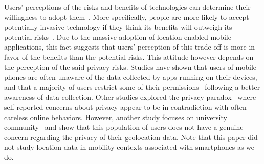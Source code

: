 

Users' perceptions of the risks and benefits of technologies can determine their willingness to adopt them~\cite{EuroUSEC16}. 
More specifically, people are more likely to accept potentially invasive technology if they think its benefits will outweigh its potential risks~\cite{1203752}.
Due to the massive adoption of location-enabled mobile applications, this fact suggests that users' perception of this trade-off is more in favor of the benefits than the potential risks.
This attitude however depends on the perception of the said privacy risks.
Studies have shown that users of mobile phones are often unaware of the data collected by apps running on their devices, and that a majority of users restrict some of their permissions~\cite{almuhimedi2015your} following a better awareness of data collection.
Other studies explored the privacy paradox~\cite{BARTH201955, kang2021smart} where self-reported concerns about privacy appear to be in contradiction with often careless online behaviors.
However, another study focuses on university community~\cite{gamarrapercepcion} and show that this population of users does not have a genuine concern regarding the privacy of their geolocation data.
Note that this paper did not study location data in mobility contexts associated with smartphones as we do.



